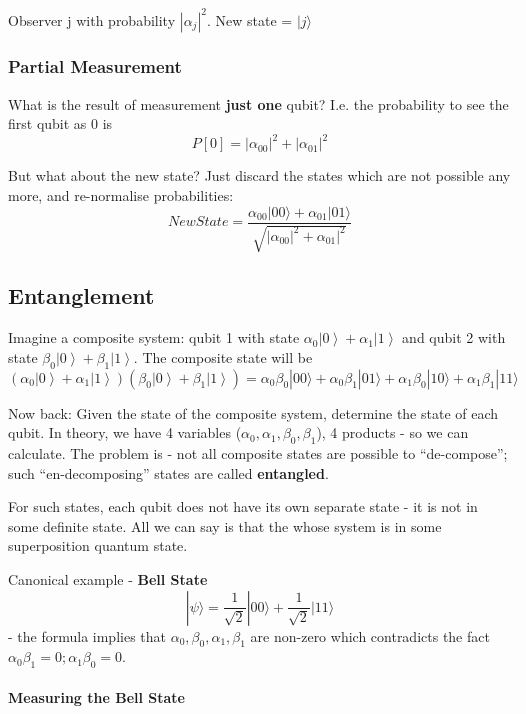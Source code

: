 \documentclass{scrartcl}
\newcommand{\ket}[1]{\left| #1 \right>} %
\begin{document}
Observer j with probability $|\alpha_j|^2$. New state = $|j\rangle$

\subsubsection{Partial Measurement}
\label{sec:3-2}

What is the result of measurement {\bf just one} qubit? I.e. the probability to
see the first qubit as 0 is $$P[0] = |\alpha_{00}|^2 + |\alpha_{01}|^2$$

But what about the new state? Just discard the states which are not possible any
more, and re-normalise probabilities: $$New State = \frac{\alpha_{00}|00\rangle
  + \alpha_{01}|01\rangle }{\sqrt{|\alpha_{00}|^2 + \alpha_{01}|^2} } $$

\subsection{Entanglement}
\label{sec:3-3}

Imagine a composite system: qubit 1 with state $\alpha_{0}\ket0 +
\alpha_{1}\ket1$ and qubit 2 with state $\beta_{0}\ket0 + \beta_{1}\ket1$. The
composite state will be \[ (\alpha_{0}\ket0 + \alpha_{1}\ket1) (\beta_{0}\ket0
+\beta_{1}\ket1) = \alpha_0 \beta_0 |00\rangle + \alpha_0 \beta_1 |01\rangle +
\alpha_1\beta_0 |10\rangle + \alpha_1 \beta_1 |11\rangle \]

Now back: Given the state of the composite system, determine the state of each
qubit. In theory, we have 4 variables ($\alpha_0, \alpha_1, \beta_0, \beta_1$),
4 products - so we can calculate. The problem is - not all composite states are
possible to ``de-compose''; such ``en-decomposing'' states are called {\bf
  entangled}.

For such states, each qubit does not have its own separate state - it is not in
some definite state. All we can say is that the whose system is in some
superposition quantum state.

Canonical example - {\bf Bell State}
$$|\psi\rangle = \frac1{\sqrt{2}} |00\rangle + \frac1{\sqrt{2}}|11\rangle $$
- the formula implies that $\alpha_0, \beta_0, \alpha_1, \beta_1$ are non-zero
which contradicts the fact $\alpha_0 \beta_1 = 0; \alpha_1 \beta_0 = 0$.

\paragraph{Measuring the Bell State}
\end{document}
